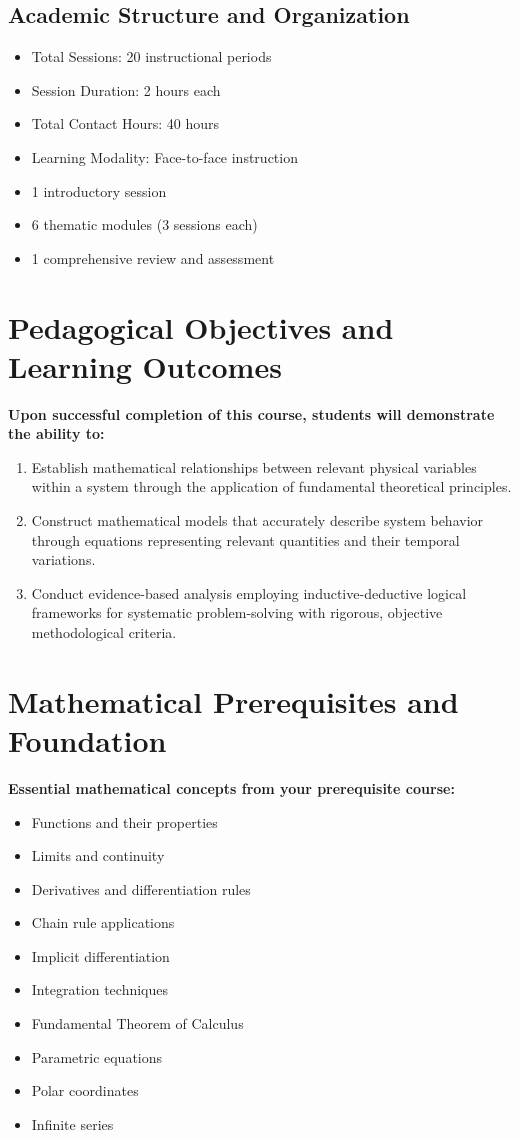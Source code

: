 \documentclass[12pt, letterpaper]{book}
\theoremstyle{problemstyle}
\theoremstyle{solutionstyle}
\begin{document}
\subsection{Academic Structure and Organization}
\begin{itemize}
    \item Total Sessions: 20 instructional periods
    \item Session Duration: 2 hours each
    \item Total Contact Hours: 40 hours
    \item Learning Modality: Face-to-face instruction
    \item 1 introductory session
    \item 6 thematic modules (3 sessions each)
    \item 1 comprehensive review and assessment
\end{itemize}

\section{Pedagogical Objectives and Learning Outcomes}
\textbf{Upon successful completion of this course, students will demonstrate the ability to:}
\begin{enumerate}
    \item Establish mathematical relationships between relevant physical variables within a system through the application of fundamental theoretical principles.
    \item Construct mathematical models that accurately describe system behavior through equations representing relevant quantities and their temporal variations.
    \item Conduct evidence-based analysis employing inductive-deductive logical frameworks for systematic problem-solving with rigorous, objective methodological criteria.
\end{enumerate}

\section{Mathematical Prerequisites and Foundation}
\textbf{Essential mathematical concepts from your prerequisite course:}
\begin{multicols}{2}
\begin{itemize}
    \item Functions and their properties
    \item Limits and continuity
    \item Derivatives and differentiation rules
    \item Chain rule applications
    \item Implicit differentiation
    \item Integration techniques
    \item Fundamental Theorem of Calculus
    \item Parametric equations
    \item Polar coordinates
    \item Infinite series
\end{itemize}
\end{multicols}
\end{document}
